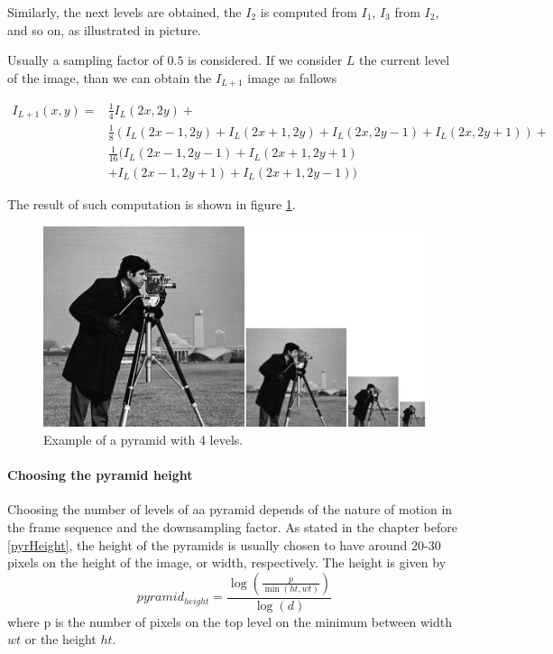 \documentclass[12pt,a4paper,twoside]{report}
\begin{document}
{Similarly, the next levels are obtained, the $I_2$ is computed from $I_1$, $I_3$ from $I_2$, and so on, as illustrated in picture.

Usually a sampling factor of $0.5$ is considered. If we consider $L$ the current level of the image, than we can obtain the $I_{L+1}$ image as fallows



\begin{equation} \label{eq1}
\begin{split}
I_{L+1}(x,y) = &\frac{1}{4}I_L(2x,2y)+\\
&\frac{1}{8}(I_L(2x-1,2y)+I_L(2x+1,2y)+I_L(2x,2y-1)+I_L(2x,2y+1))+\\
&\frac{1}{16}(I_L(2x-1,2y-1)+I_L(2x+1,2y+1)\\
&+I_L(2x-1,2y+1)+I_L(2x+1,2y-1))
\end{split}
\end{equation}

The result of such computation is shown in figure \ref{cameraPyr}.

\begin{figure}
	\label{cameraPyr}
	\centering
	\includegraphics{img/cameraman}
	\caption{Example of a pyramid with 4 levels.}
\end{figure}


\paragraph{Choosing the pyramid height} 
Choosing the number of levels of aa pyramid depends of the nature of motion in the frame sequence and the downsampling factor.
 As stated in the chapter before \ref{pyrHeight}, the height of the pyramids is usually chosen to have around 20-30 pixels on the height of the image, or width, respectively. The height is given by
\begin{equation} \label{pyrheight}
	pyramid_{height} = \frac{\log\left(\frac{p}{\min(ht,wt)}\right)}
							{\log(d)}
\end{equation}
where p is the number of pixels on the top level on the minimum between  width $wt$ or the height $ht$.
}
\end{document}
